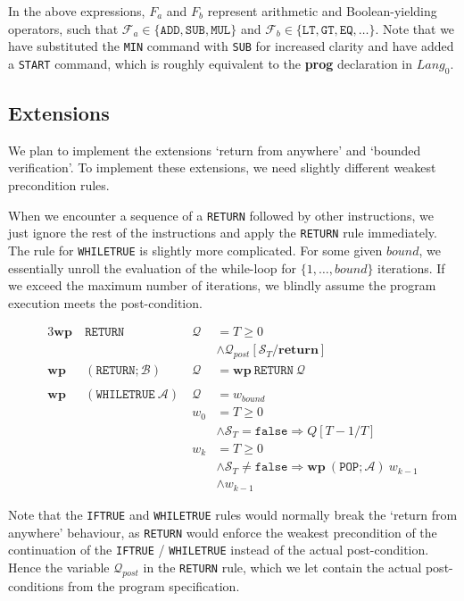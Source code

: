 \documentclass[a4paper]{article}
\newcommand{\Q}{\mathcal{Q}}
\newcommand{\A}{\mathcal{A}}
\newcommand{\B}{\mathcal{B}}
\renewcommand{\wp}{\mathbf{wp}}
\newcommand{\stack}[1]{\mathcal{S}_{#1}}
\begin{document}
In the above expressions, $F_a$ and $F_b$ represent arithmetic and Boolean-yielding operators, such that $\mathcal{F}_a \in \{\mathtt{ADD}, \mathtt{SUB}, \mathtt{MUL}\}$ and $\mathcal{F}_b \in \{\mathtt{LT}, \mathtt{GT}, \mathtt{EQ}, \ldots\}$. Note that we have substituted the \texttt{MIN} command with \texttt{SUB} for increased clarity and have added a \texttt{START} command, which is roughly equivalent to the \textbf{prog} declaration in $\mathit{Lang}_0$.

\subsection{Extensions}
We plan to implement the extensions `return from anywhere' and `bounded verification'. To implement these extensions, we need slightly different weakest precondition rules.

When we encounter a sequence of a \texttt{RETURN} followed by other instructions, we just ignore the rest of the instructions and apply the \texttt{RETURN} rule immediately. The rule for \texttt{WHILETRUE} is slightly more complicated. For some given $\mathit{bound}$, we essentially unroll the evaluation of the while-loop for $\{1, \ldots, \mathit{bound}\}$ iterations. If we exceed the maximum number of iterations, we blindly assume the program execution meets the post-condition.

\begin{alignat*}{3}
\wp\ &\mathtt{RETURN}\ &\Q &= T \geq 0\\
&&&\wedge \Q_{\mathit{post}}[\stack{T} / \mathbf{return}]\\
\wp\ &(\mathtt{RETURN}; \B)\ &\Q &= \wp\ \mathtt{RETURN}\ \Q\\\\
\wp\ &(\mathtt{WHILETRUE}\ \A)\ &\Q &= w_{\mathit{bound}}\\
&&w_0 &= T \geq 0\\
&&&\wedge \stack{T} = \mathtt{false} \Rightarrow Q[T - 1 / T]\\
&&w_k &= T \geq 0\\
&&&\wedge \stack{T} \neq \mathtt{false} \Rightarrow \wp\ (\mathtt{POP}; \A)\ w_{k-1}\\
&&&\wedge w_{k-1}
\end{alignat*}

Note that the \texttt{IFTRUE} and \texttt{WHILETRUE} rules would normally break the `return from anywhere' behaviour, as \texttt{RETURN} would enforce the weakest precondition of the continuation of the \texttt{IFTRUE} / \texttt{WHILETRUE} instead of the actual post-condition. Hence the variable $\Q_{\mathit{post}}$ in the \texttt{RETURN} rule, which we let contain the actual post-conditions from the program specification.
\end{document}

